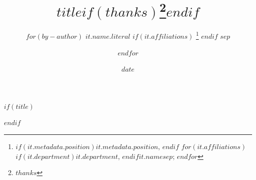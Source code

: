 $if(title)$
\title{$title$$if(thanks)$\thanks{$thanks$}$endif$}
$endif$

\author{%
$for(by-author)$
  $it.name.literal$%
  $if(it.affiliations)$
  \thanks{%
    $if(it.metadata.position)$$it.metadata.position$, $endif$%
    $for(it.affiliations)$$if(it.department)$$it.department$, $endif$$it.name$$sep$; $endfor$%
  }%
  $endif$
$sep$ \and
$endfor$
}

\date{$date$}
